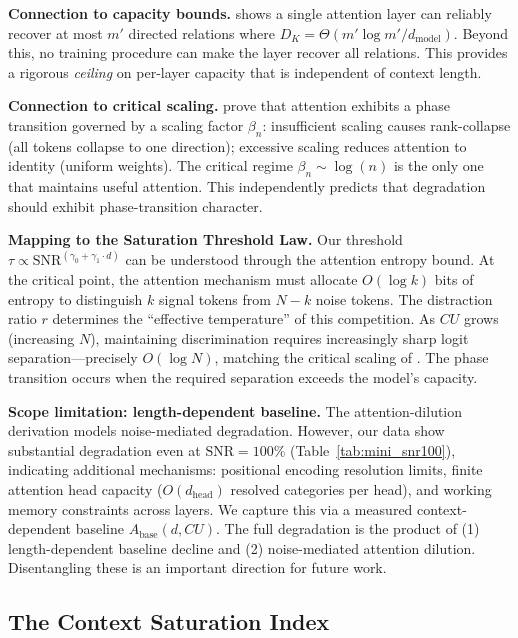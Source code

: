 \documentclass{article}
\begin{document}
\textbf{Connection to capacity bounds.} \citet{adler2025capacity} shows a single attention layer can reliably recover at most $m'$ directed relations where $D_K = \Theta(m' \log m' / d_{\text{model}})$. Beyond this, no training procedure can make the layer recover all relations. This provides a rigorous \emph{ceiling} on per-layer capacity that is independent of context length.

\textbf{Connection to critical scaling.} \citet{polyak2025critical} prove that attention exhibits a phase transition governed by a scaling factor $\beta_n$: insufficient scaling causes rank-collapse (all tokens collapse to one direction); excessive scaling reduces attention to identity (uniform weights). The critical regime $\beta_n \sim \log(n)$ is the only one that maintains useful attention. This independently predicts that degradation should exhibit phase-transition character.

\textbf{Mapping to the Saturation Threshold Law.} Our threshold $\tau \propto \mathrm{SNR}^{(\gamma_0 + \gamma_1 \cdot d)}$ can be understood through the attention entropy bound. At the critical point, the attention mechanism must allocate $O(\log k)$ bits of entropy to distinguish $k$ signal tokens from $N - k$ noise tokens. The distraction ratio $r$ determines the ``effective temperature'' of this competition. As $CU$ grows (increasing $N$), maintaining discrimination requires increasingly sharp logit separation---precisely $O(\log N)$, matching the critical scaling of \citet{polyak2025critical}. The phase transition occurs when the required separation exceeds the model's capacity.

\textbf{Scope limitation: length-dependent baseline.} The attention-dilution derivation models noise-mediated degradation. However, our data show substantial degradation even at $\mathrm{SNR}{=}100\%$ (Table~\ref{tab:mini_snr100}), indicating additional mechanisms: positional encoding resolution limits, finite attention head capacity ($O(d_{\text{head}})$ resolved categories per head), and working memory constraints across layers. We capture this via a measured context-dependent baseline $A_{\text{base}}(d, CU)$. The full degradation is the product of (1) length-dependent baseline decline and (2) noise-mediated attention dilution. Disentangling these is an important direction for future work.

\subsection{The Context Saturation Index}
\end{document}
